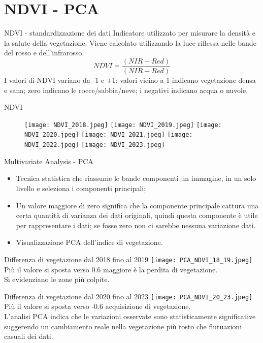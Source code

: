 \documentclass[10pt]{beamer}
\begin{document}
\section{NDVI - PCA}
\begin{frame}{NDVI - standardizzazione dei dati}
Indicatore utilizzato per misurare la densità e la salute della vegetazione. Viene calcolato utilizzando la luce riflessa nelle bande del rosso e dell'infrarosso.
\begin{equation}
NDVI = \frac{(NIR-Red)}{(NIR+Red)} 
\end{equation}
\label{NDVI}
I valori di NDVI variano da -1 e +1: valori vicino a 1 indicano vegetazione densa e sana; zero indicano le rocce/sabbia/neve; i negativi indicano acqua o nuvole. 
\end{frame}

\begin{frame}{NDVI}
\begin{figure}
        \centering
        \texttt{[image: NDVI\_2018.jpeg]}
        \texttt{[image: NDVI\_2019.jpeg]} 
        \texttt{[image: NDVI\_2020.jpeg]}
        \texttt{[image: NDVI\_2021.jpeg]}
        \texttt{[image: NDVI\_2022.jpeg]} 
        \texttt{[image: NDVI\_2023.jpeg]}
    \end{figure}
\end{frame}

\begin{frame}{Multivariate Analysis - PCA}
\begin{itemize}
    \item Tecnica statistica che riassume le bande componenti un immagine, in un solo livello e seleziona i componenti principali; 
    \item Un valore maggiore di zero significa che la componente principale cattura una certa quantità di varianza dei dati originali, quindi questa componente è utile per rappresentare i dati; se fosse zero non ci sarebbe nessuna variazione dati.
    \item Visualizzazione PCA dell'indice di vegetazione.
\end{itemize}
\end{frame}

\begin{frame}{Differenza di vegetazione dal 2018 fino al 2019}
\centering
\texttt{[image: PCA\_NDVI\_18\_19.jpeg]}\\
Più il valore si sposta verso 0.6 maggiore è la perdita di vegetazione.\\
Si evidenziano le zone più colpite.
\end{frame}
\begin{frame}{Differenza di vegetazione dal 2020 fino al 2023}
\centering
\texttt{[image: PCA\_NDVI\_20\_23.jpeg]}\\
Più il valore si sposta verso -0.6 acquisizione di vegetazione.\\
L'analisi PCA indica che le variazioni osservate  sono statisticamente significative suggerendo un cambiamento reale nella vegetazione più tosto che flutuazioni casuali dei dati.
\end{frame}   
\end{document}
